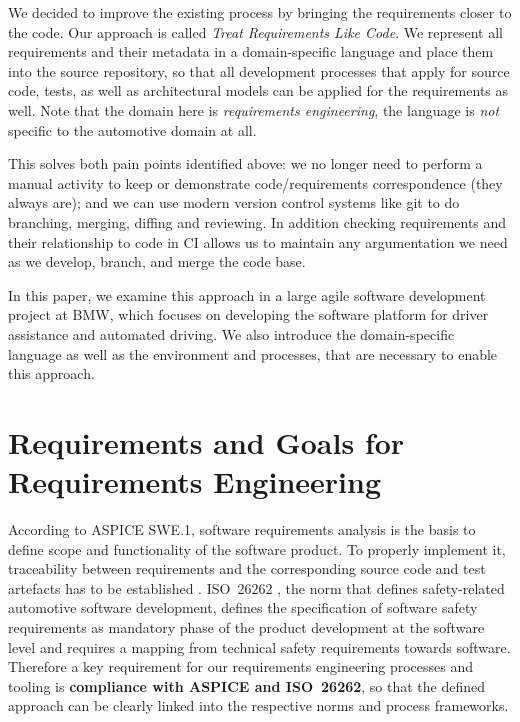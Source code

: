 \documentclass[english]{lni}
\begin{document}
We decided to improve the existing process by bringing the
requirements closer to the code. Our approach is called \emph{Treat
Requirements Like Code}. We represent all requirements and their
metadata in a domain-specific language and place them into the source
repository, so that all development processes that apply for source
code, tests, as well as architectural models \cite{becker2020} can be
applied for the requirements as well. Note that the domain here is
\emph{requirements engineering}, the language is \emph{not} specific to
the automotive domain at all.

This solves both pain points identified above: we no longer need to
perform a manual activity to keep or demonstrate code/requirements
correspondence (they always are); and we can use modern version
control systems like git to do branching, merging, diffing and
reviewing. In addition checking requirements and their relationship to
code in CI allows us to maintain any argumentation we need as we
develop, branch, and merge the code base.

In this paper, we examine this approach in a large agile software
development project at BMW, which focuses on developing the software
platform for driver assistance and automated driving. We also
introduce the domain-specific language as well as the environment and
processes, that are necessary to enable this approach.

\section{Requirements and Goals for Requirements Engineering}
\label{reqs}

According to ASPICE SWE.1, software requirements analysis is the basis
to define scope and functionality of the software product. To properly
implement it, traceability between requirements and the corresponding
source code and test artefacts has to be established
\cite{automotive_spice}. ISO~26262 \cite{iso26262_6}, the norm that defines
safety-related automotive software development, defines the
specification of software safety requirements as mandatory phase of
the product development at the software level and requires a mapping
from technical safety requirements towards software.
Therefore a key
requirement for our requirements engineering processes and tooling is
\textbf{compliance with ASPICE and ISO~26262}, so that the defined
approach can be clearly linked into the respective norms and process
frameworks.
\end{document}
